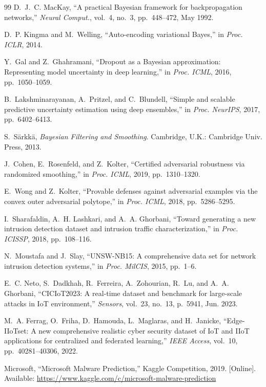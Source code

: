 \documentclass[10pt,journal,compsoc]{IEEEtran}
\begin{document}
\begin{thebibliography}{99}
D.~J.~C. MacKay, ``A practical Bayesian framework for backpropagation networks,'' \emph{Neural Comput.}, vol.~4, no.~3, pp.~448--472, May 1992.

D.~P. Kingma and M.~Welling, ``Auto-encoding variational Bayes,'' in \emph{Proc. ICLR}, 2014.

Y.~Gal and Z.~Ghahramani, ``Dropout as a Bayesian approximation: Representing model uncertainty in deep learning,'' in \emph{Proc. ICML}, 2016, pp.~1050--1059.

B.~Lakshminarayanan, A.~Pritzel, and C.~Blundell, ``Simple and scalable predictive uncertainty estimation using deep ensembles,'' in \emph{Proc. NeurIPS}, 2017, pp.~6402--6413.

S.~S\"arkk\"a, \emph{Bayesian Filtering and Smoothing}. Cambridge, U.K.: Cambridge Univ. Press, 2013.

J.~Cohen, E.~Rosenfeld, and Z.~Kolter, ``Certified adversarial robustness via randomized smoothing,'' in \emph{Proc. ICML}, 2019, pp.~1310--1320.

E.~Wong and Z.~Kolter, ``Provable defenses against adversarial examples via the convex outer adversarial polytope,'' in \emph{Proc. ICML}, 2018, pp.~5286--5295.

I.~Sharafaldin, A.~H. Lashkari, and A.~A. Ghorbani, ``Toward generating a new intrusion detection dataset and intrusion traffic characterization,'' in \emph{Proc. ICISSP}, 2018, pp.~108--116.

N.~Moustafa and J.~Slay, ``UNSW-NB15: A comprehensive data set for network intrusion detection systems,'' in \emph{Proc. MilCIS}, 2015, pp.~1--6.

E.~C. Neto, S.~Dadkhah, R.~Ferreira, A.~Zohourian, R.~Lu, and A.~A. Ghorbani, ``CICIoT2023: A real-time dataset and benchmark for large-scale attacks in IoT environment,'' \emph{Sensors}, vol.~23, no.~13, p.~5941, Jun. 2023.

M.~A. Ferrag, O.~Friha, D.~Hamouda, L.~Maglaras, and H.~Janicke, ``Edge-IIoTset: A new comprehensive realistic cyber security dataset of IoT and IIoT applications for centralized and federated learning,'' \emph{IEEE Access}, vol.~10, pp.~40281--40306, 2022.

Microsoft, ``Microsoft Malware Prediction,'' Kaggle Competition, 2019. [Online]. Available: \url{https://www.kaggle.com/c/microsoft-malware-prediction}


\end{thebibliography}
\end{document}
